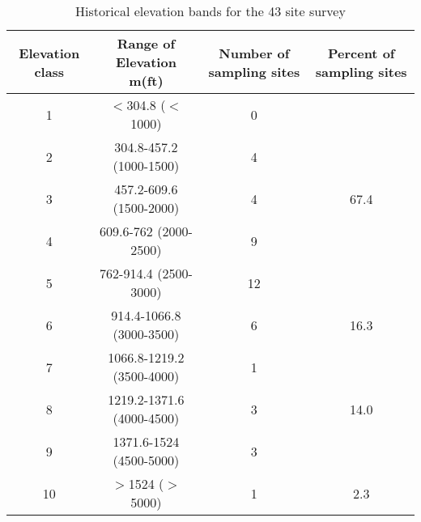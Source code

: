 \begin{table}[htbp]

\begin{tabular}{cccc}
\toprule
Elevation class & Range of Elevation m(ft) & \multicolumn{1}{p{3cm}}{Number of sampling sites} &\multicolumn{1}{p{3cm}}{Percent of sampling sites} \\ 
\midrule
1 & $<$304.8 ($<$1000) & 0 &  \\ 
2 & 304.8-457.2 (1000-1500) & 4 &  \\ 
3 & 457.2-609.6 (1500-2000) & 4 & 67.4 \\ 
4 & 609.6-762 (2000-2500) & 9 &  \\ 
5 & 762-914.4 (2500-3000) & 12 & \\ 
\midrule
6 & 914.4-1066.8 (3000-3500) & 6 & 16.3 \\ 
7 & 1066.8-1219.2 (3500-4000) & 1 &  \\ 
\midrule
8 & 1219.2-1371.6 (4000-4500) & 3 & 14.0\\ 
9 & 1371.6-1524 (4500-5000) & 3 &  \\ 
\midrule
10 & $>$1524 ($>$5000) & 1 & 2.3\\ 
\bottomrule
\end{tabular}
\caption{Historical elevation bands for the 43 site survey}
\label{tab:43sitesurvey}
\end{table}
